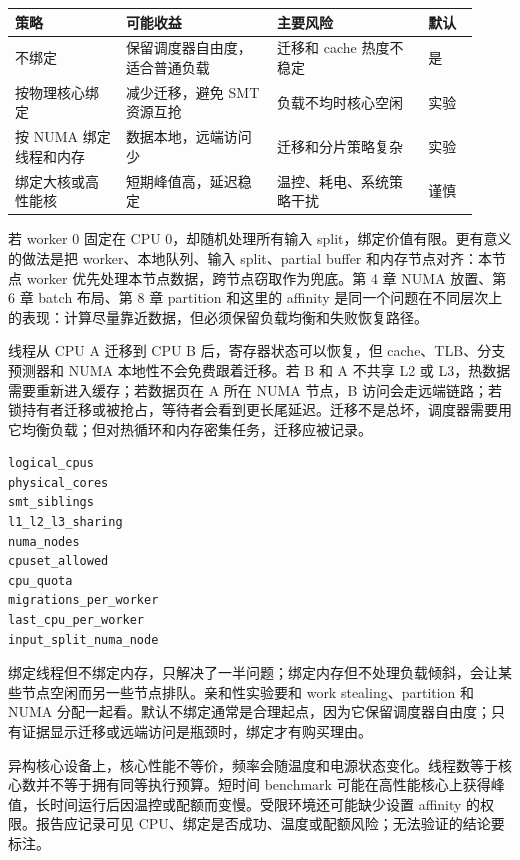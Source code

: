 \begin{center}
\begin{tabular}{@{}p{0.22\linewidth}p{0.30\linewidth}p{0.30\linewidth}p{0.10\linewidth}@{}}
\toprule
策略 & 可能收益 & 主要风险 & 默认 \\
\midrule
不绑定 & 保留调度器自由度，适合普通负载 & 迁移和 cache 热度不稳定 & 是 \\
按物理核心绑定 & 减少迁移，避免 SMT 资源互抢 & 负载不均时核心空闲 & 实验 \\
按 NUMA 绑定线程和内存 & 数据本地，远端访问少 & 迁移和分片策略复杂 & 实验 \\
绑定大核或高性能核 & 短期峰值高，延迟稳定 & 温控、耗电、系统策略干扰 & 谨慎 \\
\bottomrule
\end{tabular}
\end{center}

若 worker 0 固定在 CPU 0，却随机处理所有输入 split，绑定价值有限。更有意义的做法是把 worker、本地队列、输入 split、partial buffer 和内存节点对齐：本节点 worker 优先处理本节点数据，跨节点窃取作为兜底。第 4 章 NUMA 放置、第 6 章 batch 布局、第 8 章 partition 和这里的 affinity 是同一个问题在不同层次上的表现：计算尽量靠近数据，但必须保留负载均衡和失败恢复路径。

线程从 CPU A 迁移到 CPU B 后，寄存器状态可以恢复，但 cache、TLB、分支预测器和 NUMA 本地性不会免费跟着迁移。若 B 和 A 不共享 L2 或 L3，热数据需要重新进入缓存；若数据页在 A 所在 NUMA 节点，B 访问会走远端链路；若锁持有者迁移或被抢占，等待者会看到更长尾延迟。迁移不是总坏，调度器需要用它均衡负载；但对热循环和内存密集任务，迁移应被记录。

\begin{lstlisting}[numbers=none,caption={亲和性实验需要记录的拓扑字段}]
logical_cpus
physical_cores
smt_siblings
l1_l2_l3_sharing
numa_nodes
cpuset_allowed
cpu_quota
migrations_per_worker
last_cpu_per_worker
input_split_numa_node
\end{lstlisting}

绑定线程但不绑定内存，只解决了一半问题；绑定内存但不处理负载倾斜，会让某些节点空闲而另一些节点排队。亲和性实验要和 work stealing、partition 和 NUMA 分配一起看。默认不绑定通常是合理起点，因为它保留调度器自由度；只有证据显示迁移或远端访问是瓶颈时，绑定才有购买理由。

异构核心设备上，核心性能不等价，频率会随温度和电源状态变化。线程数等于核心数并不等于拥有同等执行预算。短时间 benchmark 可能在高性能核心上获得峰值，长时间运行后因温控或配额而变慢。受限环境还可能缺少设置 affinity 的权限。报告应记录可见 CPU、绑定是否成功、温度或配额风险；无法验证的结论要标注。


